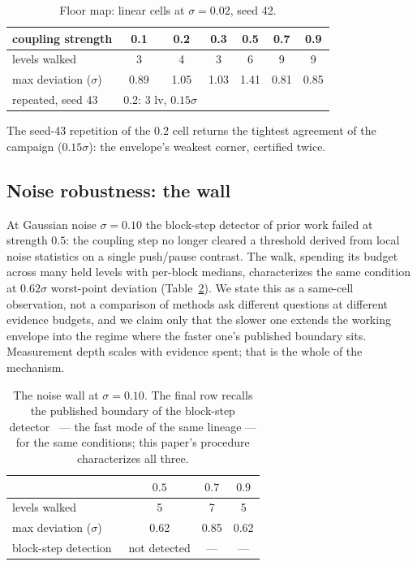 \documentclass[11pt,a4paper]{article}
\begin{document}
\begin{table}[h]
\centering
\caption{Floor map: linear cells at $\sigma{=}0.02$, seed 42.}
\label{tab:floor}
\begin{tabular}{lcccccc}
\toprule
coupling strength & 0.1 & 0.2 & 0.3 & 0.5 & 0.7 & 0.9 \\
\midrule
levels walked      & 3 & 4 & 3 & 6 & 9 & 9 \\
max deviation ($\sigma$) & 0.89 & 1.05 & 1.03 & 1.41 & 0.81 & 0.85 \\
\midrule
repeated, seed 43 & \multicolumn{2}{c}{0.2: 3 lv, $0.15\sigma$} & & & & \\
\bottomrule
\end{tabular}
\end{table}

The seed-43 repetition of the $0.2$ cell returns the tightest
agreement of the campaign ($0.15\sigma$): the envelope's weakest
corner, certified twice.

\subsection{Noise robustness: the wall}
\label{sec:wall}

At Gaussian noise $\sigma{=}0.10$ the block-step detector of prior
work failed at strength $0.5$: the coupling step no longer cleared a
threshold derived from local noise statistics on a single push/pause
contrast. The walk, spending its budget across many held levels with
per-block medians, characterizes the same condition at $0.62\sigma$
worst-point deviation (Table~\ref{tab:wall}). We state this as a
same-cell observation, not a comparison of methods
ask different questions at different evidence budgets, and we claim
only that the slower one extends the working envelope into the regime
where the faster one's published boundary sits. Measurement depth
scales with evidence spent; that is the whole of the mechanism.

\begin{table}[h]
\centering
\caption{The noise wall at $\sigma{=}0.10$. The final row recalls the
published boundary of the block-step detector~\cite{p1} --- the fast
mode of the same lineage --- for the same conditions; this paper's
procedure characterizes all three.}
\label{tab:wall}
\begin{tabular}{lccc}
\toprule
 & $0.5$ & $0.7$ & $0.9$ \\
\midrule
levels walked & 5 & 7 & 5 \\
max deviation ($\sigma$) & 0.62 & 0.85 & 0.62 \\
block-step detection~\cite{p1} & not detected & --- & --- \\
\bottomrule
\end{tabular}
\end{table}
\end{document}
